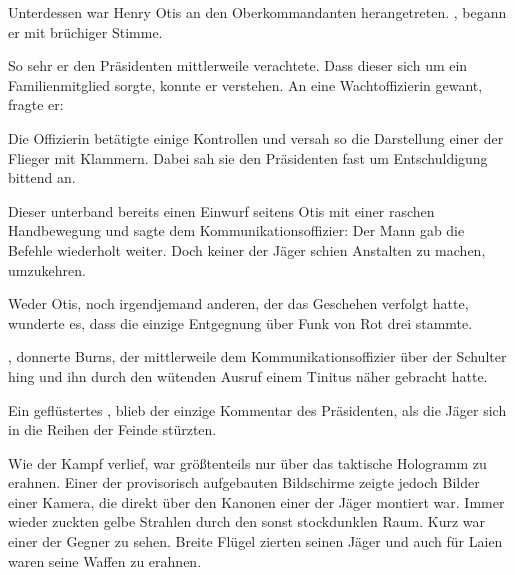 \par

Unterdessen war Henry Otis an den Oberkommandanten herangetreten. , begann er mit brüchiger Stimme. 

\par

So sehr er den Präsidenten mittlerweile verachtete. Dass dieser sich um ein Familienmitglied sorgte, konnte er verstehen. An eine Wachtoffizierin gewant, fragte er: 

\par

Die Offizierin betätigte einige Kontrollen und versah so die Darstellung einer der Flieger mit Klammern.  Dabei sah sie den Präsidenten fast um Entschuldigung bittend an.

\par

Dieser unterband bereits einen Einwurf seitens Otis mit einer raschen Handbewegung und sagte dem Kommunikationsoffizier:  Der Mann gab die Befehle wiederholt weiter. Doch keiner der Jäger schien Anstalten zu machen, umzukehren.

\par

Weder Otis, noch irgendjemand anderen, der das Geschehen verfolgt hatte, wunderte es, dass die einzige Entgegnung über Funk von Rot drei stammte. 

\par

, donnerte Burns, der mittlerweile dem Kommunikationsoffizier über der Schulter hing und ihn durch den wütenden Ausruf einem Tinitus näher gebracht hatte.

\par

Ein geflüstertes , blieb der einzige Kommentar des Präsidenten, als die Jäger sich in die Reihen der Feinde stürzten.

\par

Wie der Kampf verlief, war größtenteils nur über das taktische Hologramm zu erahnen. Einer der provisorisch aufgebauten Bildschirme zeigte jedoch Bilder einer Kamera, die direkt über den Kanonen einer der Jäger montiert war. Immer wieder zuckten gelbe Strahlen durch den sonst stockdunklen Raum. Kurz war einer der Gegner zu sehen. Breite Flügel zierten seinen Jäger und auch für Laien waren seine Waffen zu erahnen.


